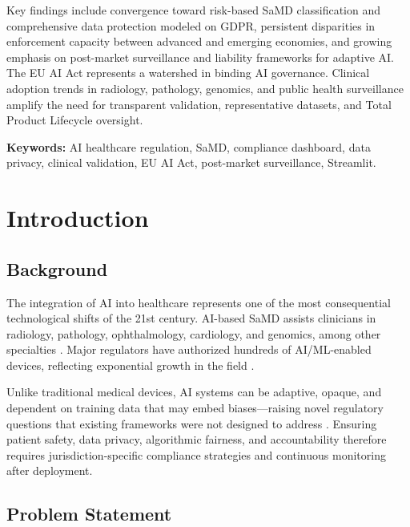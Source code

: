 \documentclass[12pt,a4paper]{report}
\begin{document}
Key findings include convergence toward risk-based SaMD classification and comprehensive data protection modeled on GDPR, persistent disparities in enforcement capacity between advanced and emerging economies, and growing emphasis on post-market surveillance and liability frameworks for adaptive AI. The EU AI Act represents a watershed in binding AI governance. Clinical adoption trends in radiology, pathology, genomics, and public health surveillance amplify the need for transparent validation, representative datasets, and Total Product Lifecycle oversight.

\textbf{Keywords:} AI healthcare regulation, SaMD, compliance dashboard, data privacy, clinical validation, EU AI Act, post-market surveillance, Streamlit.

\tableofcontents
\listoftables
\clearpage
{}

\chapter{Introduction}

\section{Background}

The integration of AI into healthcare represents one of the most consequential technological shifts of the 21st century. AI-based SaMD assists clinicians in radiology, pathology, ophthalmology, cardiology, and genomics, among other specialties \cite{topol2019,rajpurkar2022}. Major regulators have authorized hundreds of AI/ML-enabled devices, reflecting exponential growth in the field \cite{fda2021,wu2021}.

Unlike traditional medical devices, AI systems can be adaptive, opaque, and dependent on training data that may embed biases---raising novel regulatory questions that existing frameworks were not designed to address \cite{gerke2020,char2018}. Ensuring patient safety, data privacy, algorithmic fairness, and accountability therefore requires jurisdiction-specific compliance strategies and continuous monitoring after deployment.

\section{Problem Statement}
\end{document}
